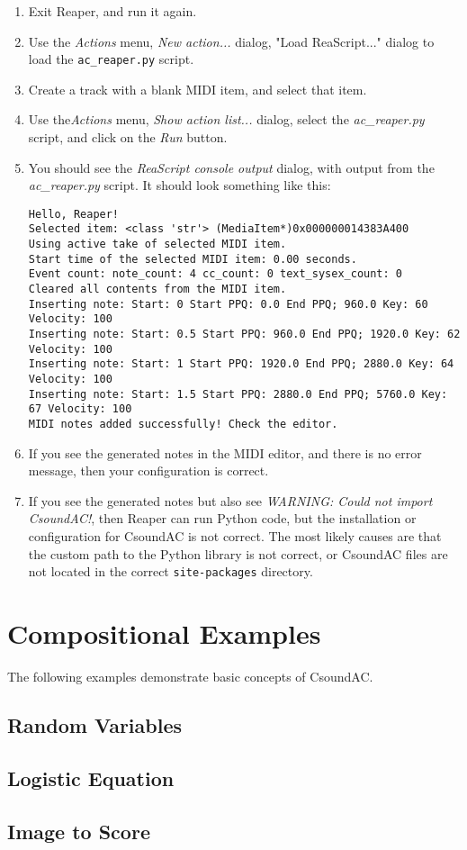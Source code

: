 \documentclass[letterpaper,10pt]{scrartcl}
\begin{document}
\begin{enumerate}
\item Exit Reaper, and run it again.
\item Use the \emph{Actions} menu, \emph{New action...} dialog, "Load ReaScript..." dialog to load the \lstinline|ac_reaper.py| script.
\item Create a track with a blank MIDI item, and select that item.
\item Use the\emph{Actions} menu, \emph{Show action list...} dialog, select the \emph{ac\_reaper.py} script, and click on the \emph{Run} button. 
\item You should see the \emph{ReaScript console output} dialog, with output from the \emph{ac\_reaper.py} script. It should look something like this:
\begin{lstlisting}
Hello, Reaper!
Selected item: <class 'str'> (MediaItem*)0x000000014383A400
Using active take of selected MIDI item.
Start time of the selected MIDI item: 0.00 seconds.
Event count: note_count: 4 cc_count: 0 text_sysex_count: 0
Cleared all contents from the MIDI item.
Inserting note: Start: 0 Start PPQ: 0.0 End PPQ; 960.0 Key: 60 Velocity: 100
Inserting note: Start: 0.5 Start PPQ: 960.0 End PPQ; 1920.0 Key: 62 Velocity: 100
Inserting note: Start: 1 Start PPQ: 1920.0 End PPQ; 2880.0 Key: 64 Velocity: 100
Inserting note: Start: 1.5 Start PPQ: 2880.0 End PPQ; 5760.0 Key: 67 Velocity: 100
MIDI notes added successfully! Check the editor.
\end{lstlisting}
\item If you see the generated notes in the MIDI editor, and there is no error message, then your configuration is correct.
\item If you see the generated notes but also see \emph{WARNING: Could not import CsoundAC!}, then Reaper can run Python code, but the installation or configuration for CsoundAC is not correct. The most likely causes are that the custom path to the Python library is not correct, or CsoundAC files are not located in the correct \lstinline|site-packages| directory.
\end{enumerate}

\section{Compositional Examples}

The following examples demonstrate basic concepts of CsoundAC. 

\subsection{Random Variables}

\subsection{Logistic Equation}

\subsection{Image to Score}
\end{document}
